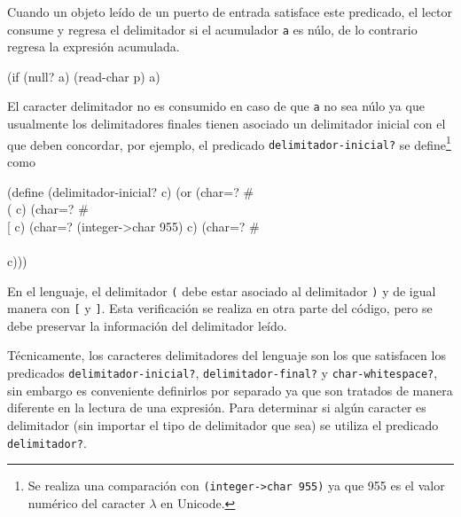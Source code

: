 Cuando un objeto leído de un puerto de entrada satisface este predicado, el lector consume y regresa el delimitador si el acumulador {\tt{}a} es núlo, de lo contrario regresa la expresión acumulada.

\nwenddocs{}\endmoddef
(if (null? a) (read-char p) a)
\nwendcode{}\nwdocspar

El caracter delimitador no es consumido en caso de que {\tt{}a} no sea núlo ya que usualmente los delimitadores finales tienen asociado un delimitador inicial con el que deben concordar, por ejemplo, el predicado {\tt{}\protect{}delimitador-inicial?} se define\footnote{Se realiza una comparación con {\tt{}(integer->char\ 955)} ya que 955 es el valor numérico del caracter \( λ \) en Unicode.} como

\nwenddocs{}\plusendmoddef
(define (delimitador-inicial? c)
  (or (char=? #\\( c)
      (char=? #\\[ c)
      (char=? (integer->char 955) c)
      (char=? #\\\\ c)))

\eatline
{}\nwendcode{}\nwdocspar

En el lenguaje, el delimitador {\tt{}{}{}(} debe estar asociado al delimitador {\tt{}{}{})} y de igual manera con {\tt{}{}{}[} y {\tt{}{}{}]}. Esta verificación se realiza en otra parte del código, pero se debe preservar la información del delimitador leído.

Técnicamente, los caracteres delimitadores del lenguaje son los que satisfacen los predicados {\tt{}\protect{}delimitador-inicial?}, {\tt{}\protect{}delimitador-final?} y {\tt{}char-whitespace?}, sin embargo es conveniente definirlos por separado ya que son tratados de manera diferente en la lectura de una expresión. Para determinar si algún caracter es delimitador (sin importar el tipo de delimitador que sea) se utiliza el predicado {\tt{}\protect{}delimitador?}.

